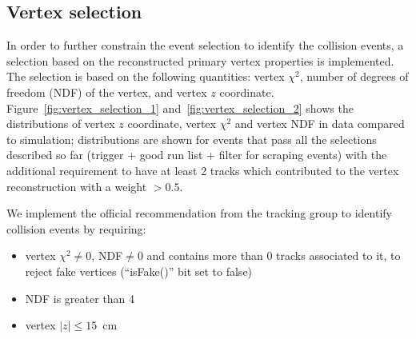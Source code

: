 \subsection{Vertex selection}
In order to further constrain the event selection to identify the
collision events, a selection based on
the reconstructed primary vertex properties is implemented. 
The selection is based on the following quantities: vertex $\chi^2$, number of
degrees of freedom (NDF) of the vertex, and vertex $z$ coordinate.
Figure~\ref{fig:vertex_selection_1} and~\ref{fig:vertex_selection_2} shows
the distributions of vertex $z$ coordinate, vertex $\chi^2$ 
and vertex NDF in data compared to simulation; distributions are shown for events 
that pass all the selections described so far (trigger + good run list + filter for scraping events) 
with the additional requirement to have at least 2 tracks which 
contributed to the vertex reconstruction with a weight $>0.5$. 

We implement the official recommendation from the tracking group 
to identify collision events by requiring:
\begin{itemize}
\item vertex $\chi^2\ne0$, NDF$\ne0$ and contains more than 0 tracks
  associated to it, to reject fake vertices (``isFake()'' bit set to false)
\item NDF is greater than 4
\item vertex $|z|\leq 15$~cm
\end{itemize}

